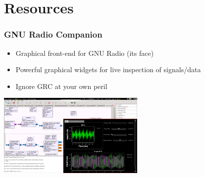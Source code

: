 \documentclass{beamer}
\begin{document}
\section{Resources}

\begin{frame}
  \frametitle{GNU Radio Companion}
  \begin{itemize}
    \item Graphical front-end for GNU Radio (its face)
    \item Powerful graphical widgets for live inspection of signals/data
    \item Ignore GRC at your own peril
  \end{itemize}
  \begin{center}
  \includegraphics[height=4cm]{grc}
  \end{center}
\end{frame}
\end{document}
